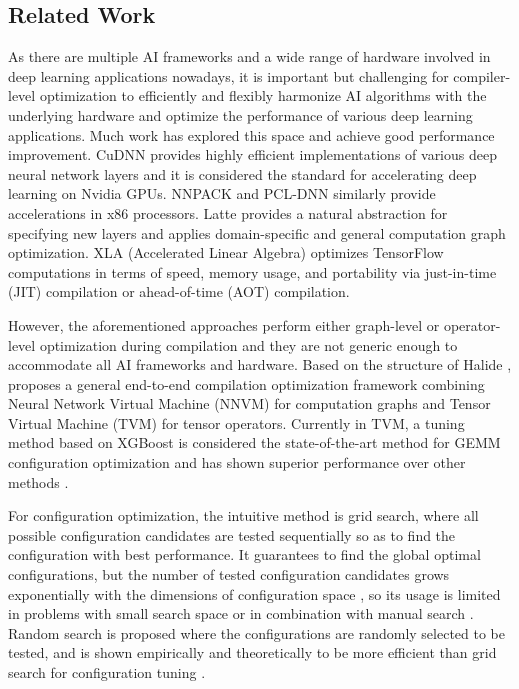 \subsection{Related Work}

As there are multiple AI frameworks and a wide range of hardware involved in deep learning applications nowadays, it is important but challenging for compiler-level optimization to efficiently and flexibly harmonize AI algorithms with the underlying hardware and optimize the performance of various deep learning applications. Much work has explored this space and achieve good performance improvement. CuDNN \cite{chetlur2014cudnn} provides highly efficient implementations of various deep neural network layers and it is considered the standard for accelerating deep learning on Nvidia GPUs. NNPACK \cite{dukhan2016nnpack} and PCL-DNN \cite{das2016distributed} similarly provide accelerations in x86 processors. Latte \cite{truong2016latte} provides a natural abstraction for specifying new layers and applies domain-specific and general computation graph optimization. XLA (Accelerated Linear Algebra) \cite{leary2017xla} optimizes TensorFlow computations in terms of speed, memory usage, and portability via just-in-time (JIT) compilation or ahead-of-time (AOT) compilation.

However, the aforementioned approaches perform either graph-level or operator-level optimization during compilation and they are not generic enough to accommodate all AI frameworks and hardware. Based on the structure of Halide \cite{ragan2013halide}, \cite{Chen18} proposes a general end-to-end compilation optimization framework combining Neural Network Virtual Machine (NNVM) \cite{nnvm2017} for computation graphs and Tensor Virtual Machine (TVM) \cite{Chen18} for tensor operators. 
Currently in TVM, a tuning method based on XGBoost \cite{chen2016xgboost} is considered the state-of-the-art method for GEMM configuration optimization and has shown superior performance over other methods \cite{Chen18}. %

For configuration optimization, the intuitive method is grid search, where all possible configuration candidates are tested sequentially so as to find the configuration with best performance. It guarantees to find the global optimal configurations, but the number of tested configuration candidates grows exponentially with the dimensions of configuration space \cite{bellman2015adaptive}, so its usage is limited in problems with small search space or in combination with manual search \cite{hinton2012practical,lecun2012efficient,larochelle2007empirical}. Random search is proposed where the configurations are randomly selected to be tested, and is shown empirically and theoretically to be more efficient than grid search for configuration tuning \cite{bergstra2012random}.

